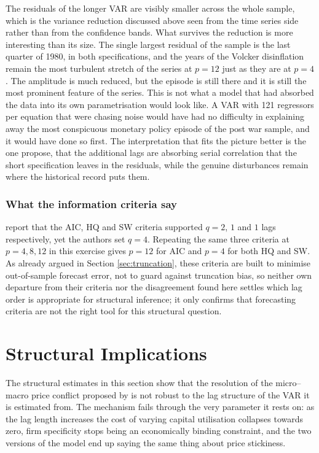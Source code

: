 \documentclass[12pt, a4paper]{article}
\begin{document}
The residuals of the longer VAR are visibly smaller across the whole sample, which is the variance reduction 
discussed above seen from the time series side rather than from the confidence bands.
What survives the reduction is more interesting than its size.
The single largest residual of the sample is the last quarter of 1980, in both specifications, and the years 
of the Volcker disinflation remain the most turbulent stretch of the series at $p = 12$ just as they are at $p = 4$.
The amplitude is much reduced, but the episode is still there and it is still the most prominent feature of the series.
This is not what a model that had absorbed the data into its own parametrisation would look like.
A VAR with 121 regressors per equation that were chasing noise would have had no difficulty in explaining away 
the most conspicuous monetary policy episode of the post war sample, and it would have done so first.
The interpretation that fits the picture better is the one \citet{Long_Lag2025} propose, that the additional lags 
are absorbing serial correlation that the short specification leaves in the residuals, while the genuine 
disturbances remain where the historical record puts them.

\subsubsection*{What the information criteria say}

\citet{ACEL2005WP} report that the AIC, HQ and SW criteria supported $q = 2$, $1$ and $1$ 
lags respectively, yet the authors set $q = 4$. Repeating the same three criteria at $p = 4, 8, 12$ in this 
exercise gives $p = 12$ for AIC and $p = 4$ for both HQ and SW. As already argued in 
Section \ref{sec:truncation}, these criteria are built to minimise out-of-sample forecast error, not to 
guard against truncation bias, so neither \citet{ACEL2005WP} own departure from their criteria nor the disagreement 
found here settles which lag order is appropriate for structural inference; it only confirms that 
forecasting criteria are not the right tool for this structural question.


\section{Structural Implications}
\label{sec:structural}

The structural estimates in this section show that the resolution of the micro--macro price
conflict proposed by \citet{ACEL2011} is not robust to the lag structure of the VAR it is
estimated from. The mechanism fails through the very parameter it rests on: as the lag length
increases the cost of varying capital utilisation collapses towards zero, firm specificity stops
being an economically binding constraint, and the two versions of the model end up saying the
same thing about price stickiness.
\end{document}
